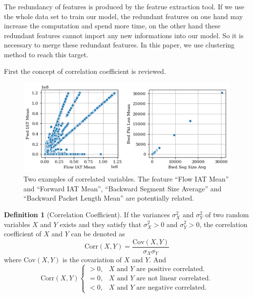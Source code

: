 \documentclass{ieeeaccess}
\theoremstyle{definition}
\newtheorem{defn}{Definition}
\begin{document}
The redundancy of features is produced by the featrue extraction tool. If we use the whole data set to train our model, the redundant features on one hand may increase the computation and spend more time, on the other hand these redundant features cannot import any new informations into our model. So it is necessary to merge these redundant features. In this paper, we use clustering method to reach this target. 

First the concept of correlation coefficient is reviewed.

\begin{figure}
    \centering
    \includegraphics[scale=0.5]{fig/scatter-correlated-variables.png}
    \caption{Two examples of correlated variables. The feature ``Flow IAT Mean'' and ``Forward IAT Mean'', ``Backward Segment Size Average'' and ``Backward Packet Length Mean'' are potentially related. }
    \label{fig:correlated-variables}
\end{figure}

\begin{defn}[Correlation Coefficient]
    If the variances $\sigma^2_X$ and $\sigma_Y^2$ of two random variables $X$ and $Y$ exists and they satisfy that $\sigma^2_X > 0$ and $\sigma^2_Y > 0$, the correlation coefficient of $X$ and $Y$ can be denoted as
\begin{equation}
    \text{Corr}(X, Y) = \frac{\text{Cov}(X, Y)}{\sigma_X \sigma_Y}
\end{equation}
where $\text{Cov}(X, Y)$ is the covariation of $X$ and $Y$. And
$$\text{Corr}(X, Y) \begin{cases}
    > 0, & X \text{ and } Y \text{ are positive correlated.}\\
    = 0, & X \text{ and } Y \text{ are not linear correlated.} \\
    < 0, & X \text{ and } Y \text{ are negative correlated.}
\end{cases}$$
\end{defn}
\end{document}
